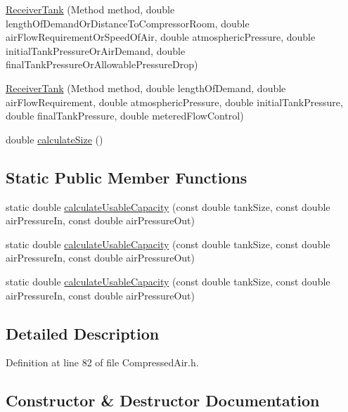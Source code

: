 \begin{DoxyCompactItemize}
\item 
\hyperlink{class_receiver_tank_a499e102ca118bfe3bdff3584310207c2}{Receiver\+Tank} (Method method, double length\+Of\+Demand\+Or\+Distance\+To\+Compressor\+Room, double air\+Flow\+Requirement\+Or\+Speed\+Of\+Air, double atmospheric\+Pressure, double initial\+Tank\+Pressure\+Or\+Air\+Demand, double final\+Tank\+Pressure\+Or\+Allowable\+Pressure\+Drop)
\item 
\hyperlink{class_receiver_tank_aba0ca17714d1009c79d6dfcfaa3cea6a}{Receiver\+Tank} (Method method, double length\+Of\+Demand, double air\+Flow\+Requirement, double atmospheric\+Pressure, double initial\+Tank\+Pressure, double final\+Tank\+Pressure, double metered\+Flow\+Control)
\item 
double \hyperlink{class_receiver_tank_a5841344b63c444e4ceb9c3b7daeaf613}{calculate\+Size} ()
\end{DoxyCompactItemize}
\subsection*{Static Public Member Functions}
\begin{DoxyCompactItemize}
\item 
static double \hyperlink{class_receiver_tank_ad17f86b7de728d4796ee5b9663dcc577}{calculate\+Usable\+Capacity} (const double tank\+Size, const double air\+Pressure\+In, const double air\+Pressure\+Out)
\item 
static double \hyperlink{class_receiver_tank_ad17f86b7de728d4796ee5b9663dcc577}{calculate\+Usable\+Capacity} (const double tank\+Size, const double air\+Pressure\+In, const double air\+Pressure\+Out)
\item 
static double \hyperlink{class_receiver_tank_ad17f86b7de728d4796ee5b9663dcc577}{calculate\+Usable\+Capacity} (const double tank\+Size, const double air\+Pressure\+In, const double air\+Pressure\+Out)
\end{DoxyCompactItemize}


\subsection{Detailed Description}


Definition at line 82 of file Compressed\+Air.\+h.



\subsection{Constructor \& Destructor Documentation}
\mbox{\label{class_receiver_tank_ad41df65fb570224e135eae7b16c15b81}} 
